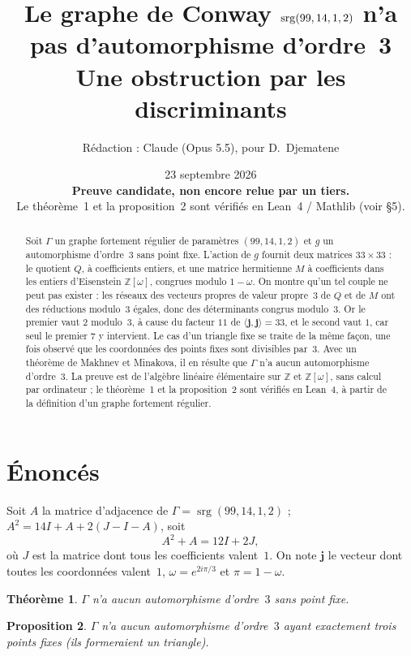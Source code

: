 \documentclass[11pt,a4paper]{article}
\title{Le graphe de Conway $\srg(99,14,1,2)$ n'a pas d'automorphisme d'ordre~3\\[3pt]
\large Une obstruction par les discriminants}
\author{Rédaction : Claude (Opus 5.5), pour D.~Djematene}
\date{23 septembre 2026 \\[4pt]
\textcolor{red!60!black}{\textbf{Preuve candidate, non encore relue par un tiers.}}\\[2pt]
\small Le théorème~1 et la proposition~2 sont vérifiés en Lean~4 / Mathlib (voir §5).}
\newtheorem{theorem}{Théorème}
\newtheorem{proposition}[theorem]{Proposition}
\theoremstyle{remark}
\newcommand{\Z}{\mathbb{Z}}
\newcommand{\one}{\mathbf{j}}
\newcommand{\srg}{\operatorname{srg}}
\begin{document}
\maketitle

\begin{abstract}
Soit $\Gamma$ un graphe fortement régulier de paramètres $(99,14,1,2)$ et $g$ un automorphisme d'ordre~3 sans point fixe.
L'action de $g$ fournit deux matrices $33\times 33$ : le quotient $Q$, à coefficients entiers, et une matrice hermitienne $M$ à
coefficients dans les entiers d'Eisenstein $\Z[\omega]$, congrues modulo $1-\omega$. On montre qu'un tel couple ne peut pas exister :
les réseaux des vecteurs propres de valeur propre~$3$ de $Q$ et de $M$ ont des réductions modulo~3 égales, donc des
déterminants congrus modulo~3. Or le premier vaut $2$ modulo~3, à cause du facteur $11$ de $\langle\one,\one\rangle=33$,
et le second vaut $1$, car seul le premier $7$ y intervient. Le cas d'un triangle fixe se traite de la même façon, une fois
observé que les coordonnées des points fixes sont divisibles par~3.
Avec un théorème de Makhnev et Minakova, il en résulte que $\Gamma$ n'a aucun automorphisme d'ordre~3.
La preuve est de l'algèbre linéaire élémentaire sur $\Z$ et $\Z[\omega]$, sans calcul par ordinateur ; le théorème~1 et la
proposition~2 sont vérifiés en Lean~4, à partir de la définition d'un graphe fortement régulier.
\end{abstract}

\section{Énoncés}

Soit $A$ la matrice d'adjacence de $\Gamma=\srg(99,14,1,2)$ ; $A^2=14I+A+2(J-I-A)$, soit
\begin{equation}\label{eq:srg}
A^2+A=12I+2J ,
\end{equation}
où $J$ est la matrice dont tous les coefficients valent~$1$. On note $\one$ le vecteur dont toutes les coordonnées valent~$1$,
$\omega=e^{2i\pi/3}$ et $\pi=1-\omega$.

\begin{theorem}\label{thm:libre}
$\Gamma$ n'a aucun automorphisme d'ordre~$3$ sans point fixe.
\end{theorem}

\begin{proposition}\label{prop:triangle}
$\Gamma$ n'a aucun automorphisme d'ordre~$3$ ayant exactement trois points fixes (ils formeraient un triangle).
\end{proposition}
\end{document}
